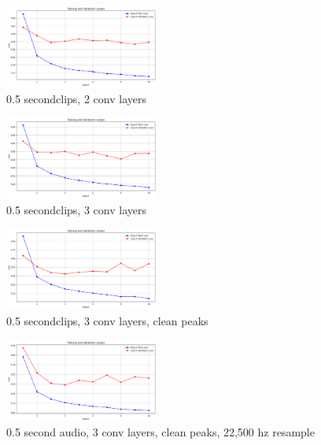 \documentclass[twocolumn]{article}
\begin{document}
\begin{figure}
\centering
\includegraphics[width=0.45\textwidth]{figures/loss_plot_halfs_2conv.png}
\caption{0.5 secondclips, 2 conv layers}
\label{fig:halfs_2conv}
\end{figure}

\begin{figure}
\centering
\includegraphics[width=0.45\textwidth]{figures/loss_plot_halfs_3conv.png}
\caption{0.5 secondclips, 3 conv layers}
\label{fig:halfs_3conv}
\end{figure}

\begin{figure}
\centering
\includegraphics[width=0.45\textwidth]{figures/loss_plot_halfs_3conv_cleanpeaks.png}
\caption{0.5 secondclips, 3 conv layers, clean peaks}
\label{fig:halfs_3conv_cleanpeaks}
\end{figure}

\begin{figure}
\centering
\includegraphics[width=0.45\textwidth]{figures/loss_plot_halfs_3conv_cleanpeaks_22500resample.png}
\caption{0.5 second audio, 3 conv layers, clean peaks, 22,500 hz resample}
\label{fig:halfs_3conv_cleanpeaks_22500hz}
\end{figure}
\end{document}
